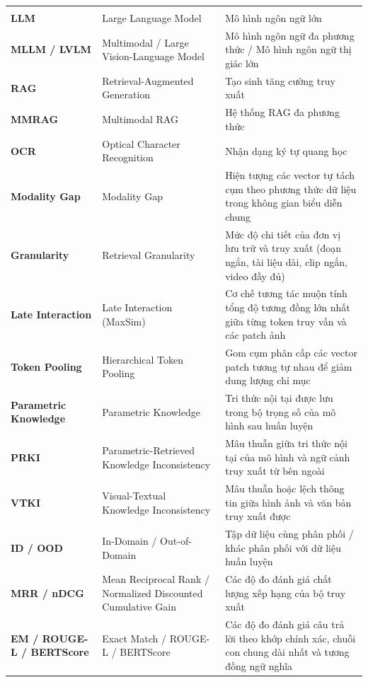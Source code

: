 {\footnotesize
\setlength{\extrarowheight}{1.2pt}
\renewcommand{\arraystretch}{1.05}
\begin{longtable}{@{}P{3.3cm}P{4.6cm}P{\dimexpr\textwidth-7.9cm-4\tabcolsep\relax}@{}}
\toprule
{}
 &  &  \\
\midrule
\endfirsthead
\toprule
{}
 &  &  \\
\midrule
\endhead
\bottomrule
\endfoot
\textbf{LLM} & Large Language Model & Mô hình ngôn ngữ lớn \\
\textbf{MLLM / LVLM} & Multimodal / Large Vision-Language Model & Mô hình ngôn ngữ đa phương thức / Mô hình ngôn ngữ thị giác lớn \\
\textbf{RAG} & Retrieval-Augmented Generation & Tạo sinh tăng cường truy xuất \\
\textbf{MMRAG} & Multimodal RAG & Hệ thống RAG đa phương thức \\
\textbf{OCR} & Optical Character Recognition & Nhận dạng ký tự quang học \\
\textbf{Modality Gap} & Modality Gap & Hiện tượng các vector tự tách cụm theo phương thức dữ liệu trong không gian biểu diễn chung \\
\textbf{Granularity} & Retrieval Granularity & Mức độ chi tiết của đơn vị lưu trữ và truy xuất (đoạn ngắn, tài liệu dài, clip ngắn, video đầy đủ) \\
\textbf{Late Interaction} & Late Interaction (MaxSim) & Cơ chế tương tác muộn tính tổng độ tương đồng lớn nhất giữa từng token truy vấn và các patch ảnh \\
\textbf{Token Pooling} & Hierarchical Token Pooling & Gom cụm phân cấp các vector patch tương tự nhau để giảm dung lượng chỉ mục \\
\textbf{Parametric Knowledge} & Parametric Knowledge & Tri thức nội tại được lưu trong bộ trọng số của mô hình sau huấn luyện \\
\textbf{PRKI} & Parametric-Retrieved Knowledge Inconsistency & Mâu thuẫn giữa tri thức nội tại của mô hình và ngữ cảnh truy xuất từ bên ngoài \\
\textbf{VTKI} & Visual-Textual Knowledge Inconsistency & Mâu thuẫn hoặc lệch thông tin giữa hình ảnh và văn bản truy xuất được \\
\textbf{ID / OOD} & In-Domain / Out-of-Domain & Tập dữ liệu cùng phân phối / khác phân phối với dữ liệu huấn luyện \\
\textbf{MRR / nDCG} & Mean Reciprocal Rank / Normalized Discounted Cumulative Gain & Các độ đo đánh giá chất lượng xếp hạng của bộ truy xuất \\
\textbf{EM / ROUGE-L / BERTScore} & Exact Match / ROUGE-L / BERTScore & Các độ đo đánh giá câu trả lời theo khớp chính xác, chuỗi con chung dài nhất và tương đồng ngữ nghĩa \\
\end{longtable}
}
